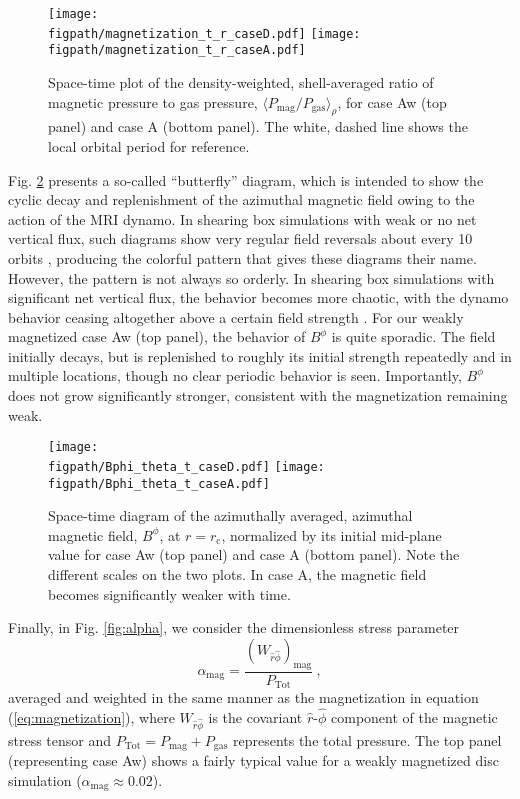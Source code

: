 \documentclass[useAMS,usenatbib]{mn2e}
\newcommand{\figpath}{.}
\begin{document}
\begin{figure}
\centering
\texttt{[image: \\figpath/magnetization\_t\_r\_caseD.pdf]}
\texttt{[image: \\figpath/magnetization\_t\_r\_caseA.pdf]}
\caption{Space-time plot of the density-weighted, shell-averaged ratio of magnetic pressure to gas pressure, $\langle P_\mathrm{mag}/P_\mathrm{gas} \rangle_\rho$, for case Aw (top panel) and case A (bottom panel). The white, dashed line shows the local orbital period for reference.}
\label{fig:pmagpgas}
\end{figure}

Fig. \ref{fig:butterfly} presents a so-called ``butterfly'' diagram, which is intended to show the cyclic decay and replenishment of the azimuthal magnetic field owing to the action of the MRI dynamo.  In shearing box simulations with weak or no net vertical flux, such diagrams show very regular field reversals about every 10 orbits \citep{Brandenburg95,Davis10,Simon12}, producing the colorful pattern that gives these diagrams their name.  However, the pattern is not always so orderly.  In shearing box simulations with significant net vertical flux, the behavior becomes more chaotic, with the dynamo behavior ceasing altogether above a certain field strength \citep{Fromang12,Bai13,Salvesen16a}.  For our weakly magnetized case Aw (top panel), the behavior of $B^\phi$ is quite sporadic.  The field initially decays, but is replenished to roughly its initial strength repeatedly and in multiple locations, though no clear periodic behavior is seen.  Importantly, $B^\phi$ does not grow significantly stronger, consistent with the magnetization remaining weak.

\begin{figure}
\centering
\texttt{[image: \\figpath/Bphi\_theta\_t\_caseD.pdf]}
\texttt{[image: \\figpath/Bphi\_theta\_t\_caseA.pdf]}
\caption{Space-time diagram of the azimuthally averaged, azimuthal magnetic field, $B^\phi$, at $r = r_\mathrm{c}$, normalized by its initial mid-plane value for case Aw (top panel) and case A (bottom panel).  Note the different scales on the two plots.  In case A, the magnetic field becomes significantly weaker with time.}
\label{fig:butterfly}
\end{figure}



Finally, in Fig. \ref{fig:alpha}, we consider the dimensionless stress parameter
\begin{equation}
\alpha_\mathrm{mag} = \frac{(W_{\hat{r}\hat{\phi}})_\mathrm{mag}}{P_\mathrm{Tot}} ~,
\end{equation}
averaged and weighted in the same manner as the magnetization in equation (\ref{eq:magnetization}), where $W_{\hat{r}\hat{\phi}}$ is the covariant $\hat{r}$-$\hat{\phi}$ component of the magnetic stress tensor and $P_\mathrm{Tot} = P_\mathrm{mag} + P_\mathrm{gas}$ represents the total pressure.  The top panel (representing case Aw) shows a fairly typical value for a weakly magnetized disc simulation ($\alpha_\mathrm{mag} \approx 0.02$).  
\end{document}
